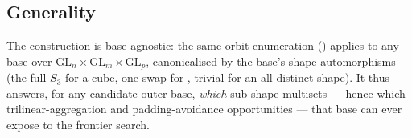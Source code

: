 \subsection{Generality}

The construction is base-agnostic: the same orbit enumeration
() applies to any base 
over \(\mathrm{GL}_n\times\mathrm{GL}_m\times\mathrm{GL}_p\), canonicalised
by the base's shape automorphisms (the full \(S_3\) for a cube, one swap
for , trivial for an all-distinct shape). It thus
answers, for any candidate outer base, \emph{which} sub-shape multisets ---
hence which trilinear-aggregation and padding-avoidance opportunities ---
that base can ever expose to the frontier search.
